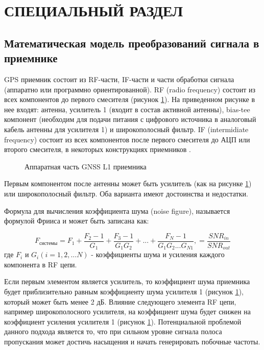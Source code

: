 \section{СПЕЦИАЛЬНЫЙ РАЗДЕЛ}

\subsection{Математическая модель преобразований сигнала в приемнике}
GPS приемник состоит из RF-части, IF-части и части обработки сигнала (аппаратно или программно ориентированной). RF (radio frequency)
состоит из всех компонентов до первого смесителя (рисунок \ref{pic:hw_receiver}). На приведенном рисунке в нее входят: антенна,
усилитель 1 (входит в состав активной антенны), bias-tee компонент (необходим для подачи питания с цифрового источника в аналоговый
кабель антенны для усилителя 1) и широкополосный фильтр. IF (intermidiate frequency) состоит из всех компонентов после первого
смесителя до АЦП или второго смесителя, в некоторых конструкциях приемников \cite{gps}.

\begin{figure}[h]
\begin{center}
\end{center}
\caption{Аппаратная часть GNSS L1 приемника}
\label{pic:hw_receiver}
\end{figure}

Первым компонентом после антенны может быть усилитель (как на рисунке \ref{pic:hw_receiver}) или широкополосный фильтр. Оба
варианта имеют достоинства и недостатки.

Формула для вычисления коэффициента шума (noise figure), называется формулой Фрииса \cite{boyd} и может быть записана как:

\begin{equation}
F_{\mbox{системы}} = 
			F_1 + \frac{F_2 - 1}{G_1} + \frac{F_3 - 1}{G_1 G_2} + ... + \frac{F_N - 1}{G_1 G_2 ... G_{N1}},
		   =
			\frac{SNR_{in}}{SNR_{out}}
\label{eq:friis}
\end{equation}
где ${F_i}$ и ${G_i (i=1,2,...N)}$ - коэффициенты шума и усиления каждого компонента в RF цепи.

Если первым элементом является усилитель, то коэффициент шума приемника будет приблизительно равным коэффициенту шума
усилителя 1 (рисунок \ref{pic:hw_receiver}), который может быть менее 2 дБ. Влияние следующего элемента RF цепи, например 
широкополосного усилителя, на коэффициент шума будет снижен на коэффициент усиления усилителя 1 (рисунок \ref{pic:hw_receiver}).
Потенциальной проблемой данного подхода является то, что при сильном уровне сигнала полоса пропускания может достичь насыщения
и начать генерировать побочные частоты.

